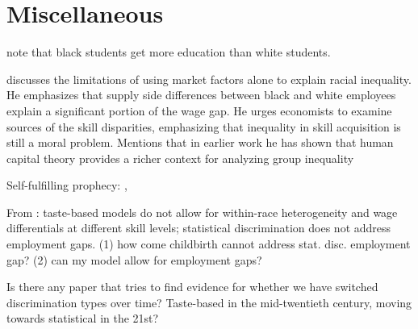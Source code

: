 \documentclass[10 pt]{article}
\begin{document}
\section{Miscellaneous}


\begin{blist}

\item \textcite{LM11} note that black students get more education than white students. 

\item \textcite{L98} discusses the limitations of using market factors alone to explain racial inequality. 
He emphasizes that supply side differences between black and white employees explain a significant portion of the wage gap.
He urges economists to examine sources of the skill disparities, emphasizing that inequality in skill acquisition is still a moral problem.
Mentions that in earlier work he has shown that human capital theory provides a richer context for analyzing group inequality



\item Self-fulfilling prophecy: \textcite{LS83}, \textcite{CL93}

\item From \textcite{LL12}: taste-based models do not allow for within-race heterogeneity and wage differentials at different skill levels; statistical discrimination does not address employment gaps. (1) how come childbirth cannot address stat. disc. employment gap? (2) can my model allow for employment gaps? 

\item Is there any paper that tries to find evidence for whether we have switched discrimination types over time? Taste-based in the mid-twentieth century, moving towards statistical in the 21st? 


\end{blist}

\printbibliography
\end{document}
